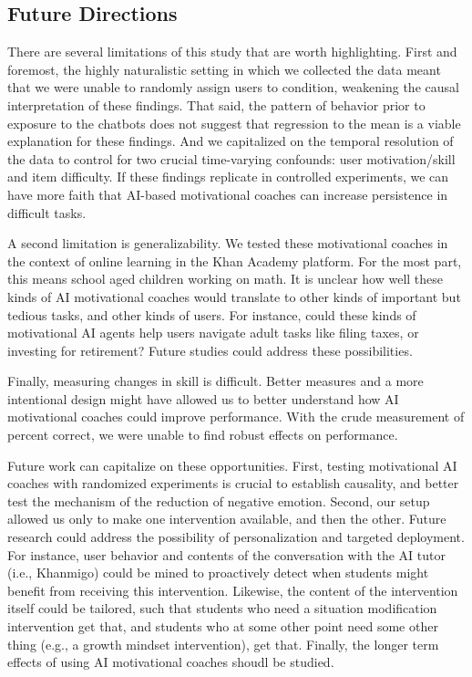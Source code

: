 \documentclass[11pt]{report}
\begin{document}
\begin{mainf}
\subsection{Future Directions}

There are several limitations of this study that are worth highlighting. 
First and foremost, the highly naturalistic setting in which we collected the data meant that we were unable to randomly assign users to condition, weakening the causal interpretation of these findings.
That said, the pattern of behavior prior to exposure to the chatbots does not suggest that regression to the mean is a viable explanation for these findings.
And we capitalized on the temporal resolution of the data to control for two crucial time-varying confounds: user motivation/skill and item difficulty.
If these findings replicate in controlled experiments, we can have more faith that AI-based motivational coaches can increase persistence in difficult tasks.

A second limitation is generalizability.
We tested these motivational coaches in the context of online learning in the Khan Academy platform.
For the most part, this means school aged children working on math.
It is unclear how well these kinds of AI motivational coaches would translate to other kinds of important but tedious tasks, and other kinds of users.
For instance, could these kinds of motivational AI agents help users navigate adult tasks like filing taxes, or investing for retirement?
Future studies could address these possibilities.

Finally, measuring changes in skill is difficult.
Better measures and a more intentional design might have allowed us to better understand how AI motivational coaches could improve performance.
With the crude measurement of percent correct, we were unable to find robust effects on performance.

Future work can capitalize on these opportunities. 
First, testing motivational AI coaches with randomized experiments is crucial to establish causality, and better test the mechanism of the reduction of negative emotion.
Second, our setup allowed us only to make one intervention available, and then the other. 
Future research could address the possibility of personalization and targeted deployment.
For instance, user behavior and contents of the conversation with the AI tutor (i.e., Khanmigo) could be mined to proactively detect when students might benefit from receiving this intervention.
Likewise, the content of the intervention itself could be tailored, such that students who need a situation modification intervention get that, and students who at some other point need some other thing (e.g., a growth mindset intervention), get that.
Finally, the longer term effects of using AI motivational coaches shoudl be studied.



\end{mainf}
\end{document}
